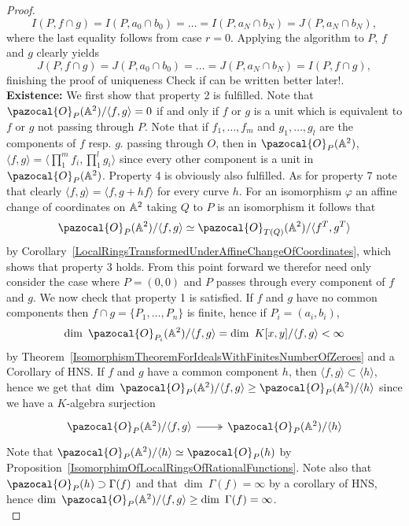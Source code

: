 \begin{proof}
        $$I(P, f\cap g ) = I(P, a_0\cap b_0)= \dots =I(P, a_N\cap b_N) = J(P,a_N\cap b_N),$$
        where the last equality follows from case $r=0$. 
        Applying the algorithm to $P$, $f$ and $g$ clearly yields 
        $$J(P,f\cap g) = J(P,a_0\cap b_0)=\dots = J(P, a_N\cap b_N) = I(P,f\cap g),$$
        finishing the proof of uniqueness {\Large Check if can be written better later!}.\\
        \textbf{Existence:}
        We first show that property 2 is fulfilled. Note that $\pazocal{O}_P(\A^2)/\langle f,g\rangle = 0$ if and only if $f$ or $g$ is a unit which is equivalent to $f$ or $g$ not passing through $P$. Note that if $f_1,\dots,f_m$ and $g_1,\dots,g_l$ are the components of $f$ resp. $g$. passing through $O$, then in $\pazocal{O}_P(\A^2)$, $\langle f, g\rangle =\langle \prod_1^m f_i, \prod_1^l g_i\rangle$ since every other component is a unit in $\pazocal{O}_P(\A^2)$. Property 4 is obviously also fulfilled. As for property 7 note that clearly $\langle f,g\rangle = \langle f,g+hf\rangle$ for every curve $h$. For an isomorphism $\varphi$ an affine change of coordinates on $\mathbb{A}^2$ taking $Q$ to $P$ is an isomorphism it follows that 
        $$\pazocal{O}_P(\A^2)/\langle f,g\rangle \simeq \pazocal{O}_{T(Q)}(\A^2)/\langle f^T,g^T\rangle$$
        by Corollary~\ref{LocalRingsTransformedUnderAffineChangeOfCoordinates}, which shows that property 3 holds. From this point forward we therefor need only consider the case where $P=(0,0)$ and $P$ passes through every component of $f$ and $g$. We now check that property 1 is satisfied. If $f$ and $g$ have no common components then $f\cap g=\{P_1,\dots,P_n\}$ is finite, hence if $P_i=(a_i,b_i)$, 
        $$\dim\ \pazocal{O}_{P_i}(\A^2)/\langle f,g\rangle=\dim \ K[x,y]/\langle f,g\rangle < \infty$$
        by Theorem~\ref{IsomorphismTheoremForIdealsWithFinitesNumberOfZeroes} and a Corollary of HNS. If $f$ and $g$ have a common component $h$, then $\langle f,g\rangle \subset \langle h \rangle$, hence we get that $\dim \ \pazocal{O}_P(\A^2)/\langle f,g\rangle\geq \pazocal{O}_P(\A^2)/\langle h \rangle$ since we have a $K$-algebra surjection  
        $$\begin{tikzcd}
            \pazocal{O}_P(\A^2)/\langle f,g\rangle  \arrow[r,twoheadrightarrow] & \pazocal{O}_P(\A^2)/\langle h\rangle 
        \end{tikzcd}$$
        Note that $\pazocal{O}_P(\A^2)/\langle h\rangle \simeq \pazocal{O}_P(h)$ by Proposition~\ref{IsomorphimOfLocalRingsOfRationalFunctions}. Note also that $\pazocal{O}_P(h) \supset \Gamma(f)$ and that $\dim\ \Gamma(f)=\infty$ by a corollary of HNS, hence $\dim\ \pazocal{O}_P(\A^2)/\langle f,g\rangle\geq \dim \ \Gamma(f)=\infty$.\\

\end{proof}
